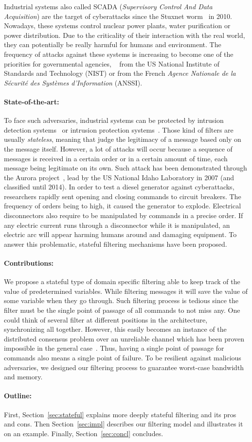 Industrial systems also called SCADA (\emph{Supervisory Control And
Data Acquisition}) are the target of cyberattacks since the Stuxnet
worm~\cite{Lan11} in 2010.
Nowadays, these systems control nuclear power plants, water purification or
power distribution.
Due to the criticality of their interaction with the real world, they can
potentially be really harmful for humans and environment.
The frequency of attacks against these systems is increasing to become one of the
priorities for governmental agencies, \eg~\cite{SFS11} from the US
National Institute of Standards and Technology (NIST) or
\cite{ANSSI12_guide_securite_industrielle_en} from the French {\em Agence
Nationale de la Sécurité des Systèmes d'Information} (ANSSI).

\paragraph{State-of-the-art:} To face such adversaries, industrial systems can
be protected by intrusion detection
systems~\cite{StoneGate13,Pax99,Suricata,Snort} or intrusion protection
systems~\cite{DESIRE10,StoneGate11,rWeb13,DZNetwork14}.
Those kind of filters are usually {\em stateless}, meaning that judge the 
legitimacy of a message based only on the message itself.
However, a lot of attacks will occur because a sequence of messages is received
in a certain order or in a certain amount of time, each message being legitimate
on its own.
Such attack has been demonstrated through the Aurora project~\cite{Aurora}, lead
by the US National Idaho Laboratory in 2007 (and classified until 2014).
In order to test a diesel generator against cyberattacks, researchers rapidly 
sent opening and closing commands to circuit breakers.
The frequency of orders being to high, it caused the generator to explode.
Electrical disconnectors also require to be manipulated by commands in a precise
order.
If any electric current runs through a disconnector while it is manipulated, an
electric arc will appear harming humans around and damaging equipment.
To answer this problematic, stateful filtering mechanisms have been proposed. \TODO

\paragraph{Contributions:} We propose a stateful type of domain specific
filtering able to keep track of the value of predetermined variables.
While filtering messages it will save the value of some variable when they go
through.
Such filtering process is tedious since the filter must be the single point of
passage of all commands to not miss any.
One could think of several filter at different positions in the architecture,
synchronizing all together.
However, this easily becomes an instance of the distributed consensus problem
over an unreliable channel which has been proven impossible in the general
case~\cite{FLP85}.
Thus, having a single point of passage for commands also means a single point of
failure.
To be resilient against malicious adversaries, we designed our filtering process
to guarantee worst-case bandwidth and memory.


\paragraph{Outline:} First, Section~\ref{sec:stateful} explains more deeply
stateful filtering and its pros and cons.
Then Section~\ref{sec:impl} describes our filtering model and illustrates it on
an example.
Finally, Section~\ref{sec:concl} concludes.
